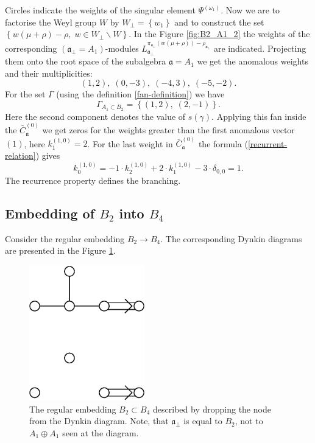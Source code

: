 \documentclass[12pt]{iopart}
\theoremstyle{definition}
\begin{document}
Circles indicate the weights of the singular element $\Psi^{(\omega_1)}$.
Now we are to factorise the Weyl group $W$ by $W_{\bot}=\left\{w_1\right\}$
and to construct the set $\left\{w(\mu+\rho)-\rho,\; w\in W_{\bot}\backslash W\right\}$.
In the Figure \ref{fig:B2_A1_2} the weights of the corresponding
$\left(\mathfrak{a}_{\bot}=A_1\right)$-modules
$L^{\pi_{\mathfrak{a}_{\bot}}(w(\mu+\rho))-\rho_{\mathfrak{a}_{\bot}}}_{\mathfrak{a}_{\bot}}$
are indicated. Projecting them onto the root space of the subalgebra $\mathfrak{a}=A_1$
we get the anomalous weights and their multiplicities:
\begin{equation*}
  \label{eq:25}
  (1,2),\; (0,-3),\; (-4,3),\; (-5,-2).
\end{equation*}
For the set $\Gamma$ (using the definition \ref{fan-definition}) we have
\begin{equation*}
  \label{eq:22}
  \Gamma_{A_1\subset B_2}=\left\{ (1,2),\; (2,-1) \right\}.
\end{equation*}
Here the second component denotes the value of $s(\gamma)$.
Applying this fan inside the $\bar{C}^{(0)}_{\mathfrak{a}}$ we get zeros for the weights
greater than the first anomalous vector $(1)$, here $k^{(1,0)}_1=2$. For the last weight in $\bar{C}^{(0)}_{\mathfrak{a}}$ the formula (\ref{recurrent-relation}) gives
\begin{equation*}
  \label{eq:23}
  k^{(1,0)}_{0}=-1\cdot k^{(1,0)}_2 +2\cdot k^{(1,0)}_1 - 3\cdot \delta_{0,0} = 1.
\end{equation*}
The recurrence property defines the branching.

\subsection{Embedding of $B_2$ into $B_4$}
\label{sec:someth-high-dimens}
Consider the regular embedding $B_2 \longrightarrow B_4$.
The corresponding Dynkin diagrams are presented in the Figure \ref{fig:dynkin}.
\begin{figure}[h]
  \centering
  \includegraphics[width=50mm]{figure3.eps}
  \caption{The regular embedding $B_2\subset B_4$ described by dropping the node from the Dynkin diagram. Note, that $\mathfrak{a}_{\bot}$ is equal to $B_2$, not to $A_1\oplus A_1$ seen at the diagram.}
  \label{fig:dynkin}
\end{figure}
\end{document}
